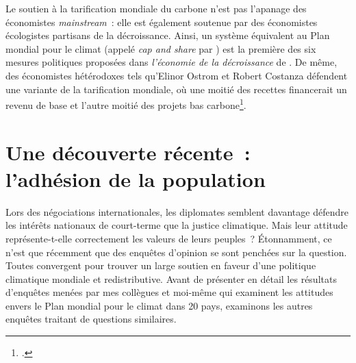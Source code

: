 \documentclass[a5paper,french,openany]{memoir}
\begin{document}
Le soutien à la tarification mondiale du carbone n'est pas l'apanage des économistes \textit{mainstream}~: elle est également soutenue par des économistes  écologistes partisans de la décroissance. Ainsi, un système équivalent au Plan mondial pour le climat (appelé \textit{cap and share} par \citealp{douthwaite_degrowth_2012}) est la première des six mesures politiques proposées dans \textit{l'économie de la décroissance} de \cite{kallis_economics_2012}. De même, des économistes hétérodoxes tels qu'Elinor Ostrom et Robert Costanza défendent une variante de la tarification mondiale, où une moitié des recettes  financerait un revenu de base et l'autre moitié des projets bas carbone\footnote{\cite{barnes_creating_2008}.}.%

\section{Une découverte récente~: l'adhésion de la population} \label{sec:soutien}

Lors des négociations internationales, les diplomates semblent davantage défendre les intérêts nationaux de court-terme que la justice climatique. 
Mais leur attitude représente-t-elle correctement les valeurs de leurs peuples~? 
Étonnamment, ce n'est que récemment que des enquêtes d'opinion se sont penchées sur la question. Toutes convergent pour trouver un large soutien en faveur d'une politique climatique mondiale et redistributive. Avant de présenter en détail les résultats d'enquêtes menées par mes collègues et moi-même qui examinent les attitudes envers le Plan mondial pour le climat dans 20 pays, %
examinons les autres enquêtes traitant de questions similaires. 
\end{document}
